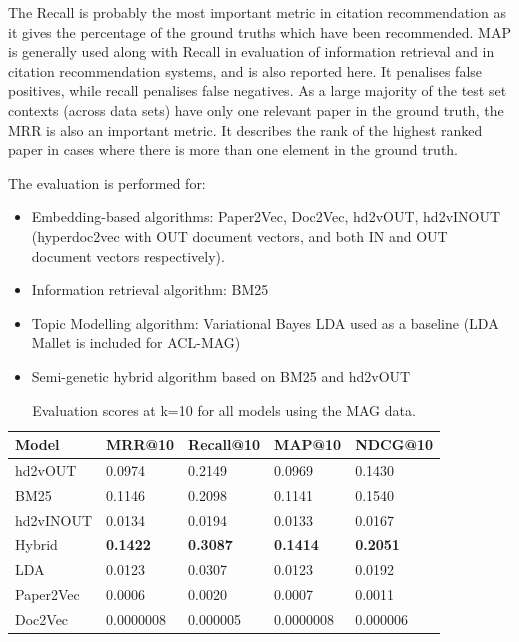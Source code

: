 The Recall is probably the most important metric in citation recommendation as it gives the percentage of the ground truths which have been recommended. MAP is generally used along with Recall in evaluation of information retrieval and in citation recommendation systems, and is also reported here. It penalises false positives, while recall penalises false negatives. As a large majority of the test set contexts (across data sets) have only one relevant paper in the ground truth, the MRR is also an important metric. It describes the rank of the highest ranked paper in cases where there is more than one element in the ground truth. 

The evaluation is performed for: 
\begin{itemize}
    \item Embedding-based algorithms: Paper2Vec, Doc2Vec, hd2vOUT, hd2vINOUT (hyperdoc2vec with OUT document vectors, and both IN and OUT document vectors respectively).
    \item Information retrieval algorithm: BM25
    \item Topic Modelling algorithm: Variational Bayes LDA used as a baseline (LDA Mallet is included for ACL-MAG)
    \item Semi-genetic hybrid algorithm based on BM25 and hd2vOUT
\end{itemize}
\begin{table}[]
\centering
    \caption{Evaluation scores at k=10 for all models using the MAG data.}
    \label{tab:magevalk10}
\begin{center}
    \begin{tabular}{lllll}
    \toprule
    Model & MRR@10 & Recall@10 & MAP@10 & NDCG@10 \\
    \midrule
    hd2vOUT  & 0.0974 & 0.2149 & 0.0969 & 0.1430 \\
    BM25       & 0.1146 & 0.2098 & 0.1141 & 0.1540 \\
    hd2vINOUT & 0.0134 & 0.0194 & 0.0133 & 0.0167 \\
    Hybrid  & \textbf{0.1422} & \textbf{0.3087} & \textbf{0.1414} & \textbf{0.2051} \\
    LDA     & 0.0123 & 0.0307 & 0.0123 & 0.0192 \\
    Paper2Vec        & 0.0006 & 0.0020 & 0.0007 & 0.0011 \\
    Doc2Vec       & 0.0000008 & 0.000005 & 0.0000008 & 0.000006 \\
    \bottomrule
    \end{tabular}
\end{center}
\end{table}
